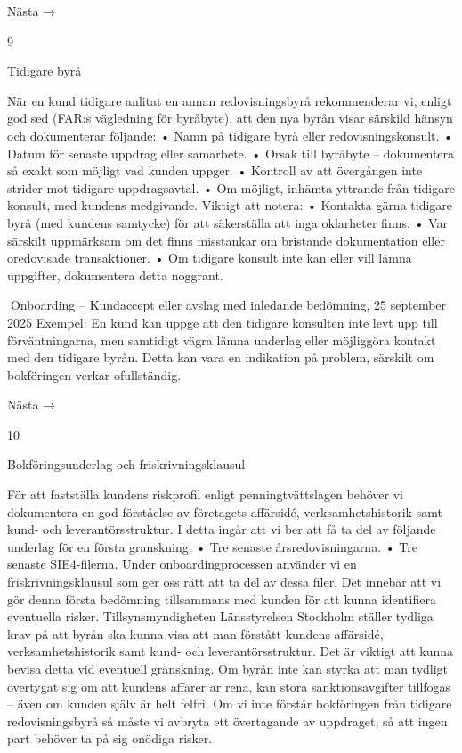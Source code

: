 Nästa →

9

Tidigare byrå

När en kund tidigare anlitat en annan redovisningsbyrå rekommenderar vi, enligt god sed
(FAR:s vägledning för byråbyte), att den nya byrån visar särskild hänsyn och dokumenterar följande:
• Namn på tidigare byrå eller redovisningskonsult.
• Datum för senaste uppdrag eller samarbete.
• Orsak till byråbyte – dokumentera så exakt som möjligt vad kunden uppger.
• Kontroll av att övergången inte strider mot tidigare uppdragsavtal.
• Om möjligt, inhämta yttrande från tidigare konsult, med kundens medgivande.
Viktigt att notera:
• Kontakta gärna tidigare byrå (med kundens samtycke) för att säkerställa att inga
oklarheter finns.
• Var särskilt uppmärksam om det finns misstankar om bristande dokumentation
eller oredovisade transaktioner.
• Om tidigare konsult inte kan eller vill lämna uppgifter, dokumentera detta noggrant.

Onboarding – Kundaccept eller avslag med inledande bedömning,
25 september 2025
Exempel:
En kund kan uppge att den tidigare konsulten inte levt upp till förväntningarna,
men samtidigt vägra lämna underlag eller möjliggöra kontakt med den tidigare
byrån. Detta kan vara en indikation på problem, särskilt om bokföringen verkar
ofullständig.

Nästa →

10

Bokföringsunderlag och friskrivningsklausul

För att fastställa kundens riskprofil enligt penningtvättslagen behöver vi dokumentera
en god förståelse av företagets affärsidé, verksamhetshistorik samt kund- och leverantörsstruktur.
I detta ingår att vi ber att få ta del av följande underlag för en första granskning:
• Tre senaste årsredovisningarna.
• Tre senaste SIE4-filerna.
Under onboardingprocessen använder vi en friskrivningsklausul som ger oss rätt att
ta del av dessa filer. Det innebär att vi gör denna första bedömning tillsammans med
kunden för att kunna identifiera eventuella risker.
Tillsynsmyndigheten Länsstyrelsen Stockholm ställer tydliga krav på att byrån ska
kunna visa att man förstått kundens affärsidé, verksamhetshistorik samt kund- och leverantörsstruktur.
Det är viktigt att kunna bevisa detta vid eventuell granskning. Om byrån inte kan
styrka att man tydligt övertygat sig om att kundens affärer är rena, kan stora sanktionsavgifter tillfogas – även om kunden själv är helt felfri. Om vi inte förstår bokföringen från
tidigare redovisningsbyrå så måste vi avbryta ett övertagande av uppdraget, så att ingen
part behöver ta på sig onödiga risker.

